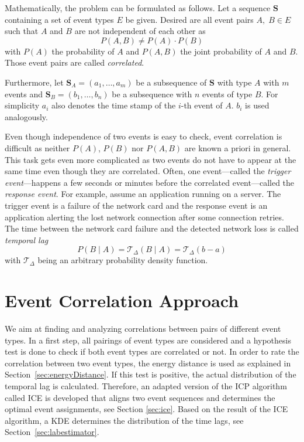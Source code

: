 \documentclass[conference]{IEEEtran}
\theoremstyle{examplestyle}
\begin{document}
Mathematically, the problem can be formulated as follows. Let a sequence \(\pmb{S}\) containing a set of event types \(E\) be given. Desired are all event pairs \(A, \; B \in E\) such that \(A\) and \(B\) are not independent of each other as
\begin{equation}
	P(A, B) \neq P(A) \cdot P(B)
\end{equation}
with \(P(A)\) the probability of \(A\) and \(P(A, B)\) the joint probability of \(A\) and \(B\). Those event pairs are called \textit{correlated}.

Furthermore, let \(\pmb{S}_A = (a_1,\ldots, a_m)\) be a subsequence of \(\pmb{S}\) with type \(A\) with \(m\) events and \(\pmb{S}_B=(b_1,\ldots, b_n)\) be a subsequence with \(n\) events of type \(B\). For simplicity \(a_i\) also denotes the time stamp of the \(i\)-th event of \(A\). \(b_i\) is used analogously.

Even though independence of two events is easy to check, event correlation is difficult as neither \(P(A)\), \(P(B)\) nor \(P(A, B)\) are known a priori in general. This task gets even more complicated as two events do not have to appear at the same time even though they are correlated. Often, one event---called the \textit{trigger event}---happens a few seconds or minutes before the correlated event---called the \textit{response event}. For example, assume an application running on a server. The trigger event is a failure of the network card and the response event is an application alerting the lost network connection after some connection retries. The time between the network card failure and the detected network loss is called \textit{temporal lag}
\begin{equation}
	P(B \; | \; A) = \mathcal{T}_\Delta (B \; | \; A) = \mathcal{T}_\Delta (b - a)
\end{equation}
with \(\mathcal{T}_\Delta\) being an arbitrary probability density function.




\section{Event Correlation Approach}
\label{sec:approach}
We aim at finding and analyzing correlations between pairs of different event types. In a first step, all pairings of event types are considered and a hypothesis test is done to check if both event types are correlated or not. In order to rate the correlation between two event types, the energy distance \cite{Rizzo2016} is used as explained in Section~\ref{sec:energyDistance}. 
If this test is positive, the actual distribution of the temporal lag is calculated. Therefore, an adapted version of the \ac{ICP} algorithm called \ac{ICE} is developed that aligns two event sequences and determines the optimal event assignments, see Section \ref{sec:ice}.
Based on the result of the \ac{ICE} algorithm, a \ac{KDE} determines the distribution of the time lags, see Section~\ref{sec:labestimator}.
\end{document}
